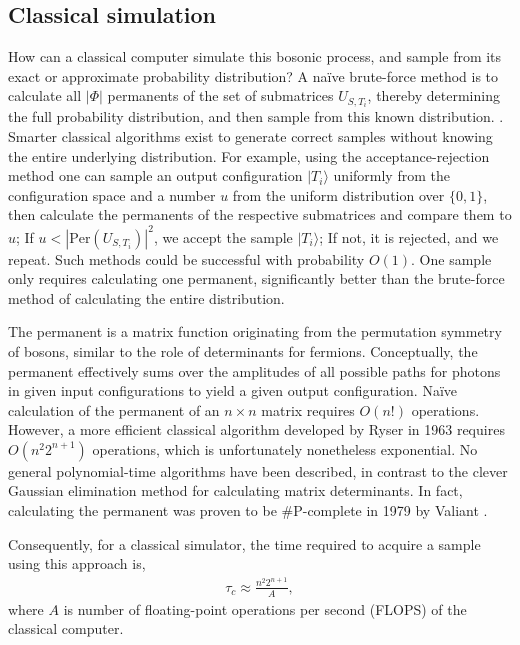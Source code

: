 \documentclass[aps,rmp,twocolumn,amsmath,amssymb,nofootinbib,superscriptaddress]{revtex4}
\newcommand{\ket}[1]{|#1\rangle}
\newcommand{\comment}[1]{{\color{blue}{#1}}}
\begin{document}
\subsection{Classical simulation}

How can a classical computer simulate this bosonic process, and sample from its exact or approximate probability distribution? A na{\"i}ve brute-force method is to calculate all $|\Phi|$ permanents of the set of submatrices $U_{S,T_i}$, thereby determining the full probability distribution, and then sample from this known distribution. \textbf{\comment{However, neither does the boson-sampler know even the approximate probability distribution before enough samples are obtained}} \comment{What does that sentence mean?}. Smarter classical algorithms exist to generate correct samples without knowing the entire underlying distribution. For example, using the acceptance-rejection method \cite{bib:15} \comment{Is there a better reference than Wikipedia?} one can sample an output configuration $\ket{T_i}$ uniformly from the configuration space and a number $u$ from the uniform distribution over $\{0,1\}$, then calculate the permanents of the respective submatrices and compare them to $u$; If \mbox{$u<|\mathrm{Per}(U_{S,T_i})|^2$}, we accept the sample $\ket{T_i}$; If not, it is rejected, and we repeat. Such methods could be successful with probability $O(1)$. One sample only requires calculating one permanent, significantly better than the brute-force method of calculating the entire distribution.

The permanent is a matrix function originating from the permutation symmetry of bosons, similar to the role of determinants for fermions. Conceptually, the permanent effectively sums over the amplitudes of all possible paths for photons in given input configurations to yield a given output configuration. Na{\"i}ve calculation of the permanent of an $n\times n$ matrix requires $O(n!)$ operations. However, a more efficient classical algorithm developed by Ryser \cite{bib:16} in 1963 requires $O(n^2 2^{n+1})$ operations, which is unfortunately nonetheless exponential. No general polynomial-time algorithms have been described, in contrast to the clever Gaussian elimination method for calculating matrix determinants. In fact, calculating the permanent was proven to be \#P-complete in 1979 by Valiant \cite{bib:17}.

Consequently, for a classical simulator, the time required to acquire a sample using this approach is,
\begin{align} \label{eq:tau_c}
\tau_c \approx \frac{n^2 2^{n+1}}{A},
\end{align}
where $A$ is number of floating-point operations per second (FLOPS) of the classical computer.
\end{document}
